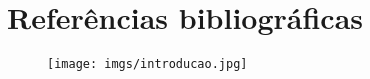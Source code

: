 \documentclass[aspectratio=169]{beamer}
\begin{document}
% 
% 
% 
% 


\section{Referências bibliográficas}

\begin{frame}
\titlepage %

\begin{figure}[!h]
  \centering
  \texttt{[image: imgs/introducao.jpg]}
  \label{fig_introducao}
\end{figure}
\end{frame}
\end{document}
